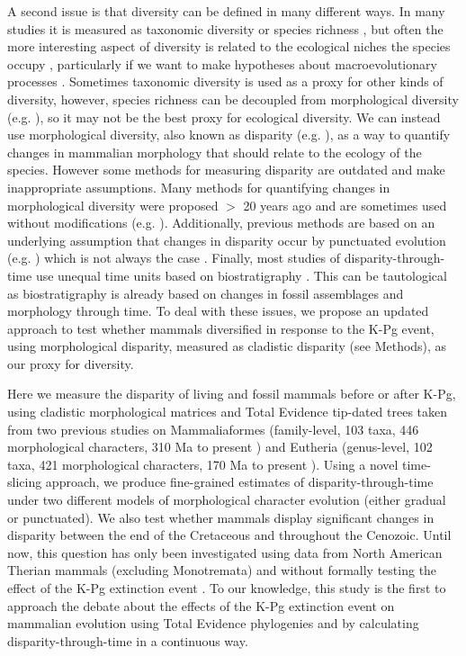 \documentclass[12pt,letterpaper]{article}
\begin{document}
A second issue is that diversity can be defined in many different ways.
In many studies it is measured as taxonomic diversity or species richness \cite{Stadler12042011,meredithimpacts2011,OLeary08022013}, but often the more interesting aspect of diversity is related to the ecological niches the species occupy \cite{Brusatte12092008,toljagictriassic-jurassic2013}, particularly if we want to make hypotheses about macroevolutionary processes \cite{Losos2010,glor2010phylogenetic,benton2015}.
Sometimes taxonomic diversity is used as a proxy for other kinds of diversity, however, species richness can be decoupled from morphological diversity (e.g. \cite{slaterCetacean,ruta2013,hopkinsdecoupling2013}), so it may not be the best proxy for ecological diversity.
We can instead use morphological diversity, also known as disparity (e.g. \cite{Wills1994}), as a way to quantify changes in mammalian morphology that should relate to the ecology of the species.
However some methods for measuring disparity are outdated and make inappropriate assumptions.
Many methods for quantifying changes in morphological diversity were proposed $>$ 20 years ago \cite{Foote01071994,Wills1994} and are sometimes used without modifications (e.g. \cite{Brusatte12092008,thorneresetting2011,toljagictriassic-jurassic2013,ruta2013,bensonfaunal2014}).
Additionally, previous methods are based on an underlying assumption that changes in disparity occur by punctuated evolution (e.g. \cite{Brusatte12092008}) which is not always the case \cite{Hunt21042015}.
Finally, most studies of disparity-through-time use unequal time units based on biostratigraphy \cite{Brusatte12092008,toljagictriassic-jurassic2013}. 
This can be tautological as biostratigraphy is already based on changes in fossil assemblages and morphology through time.
To deal with these issues, we propose an updated approach to test whether mammals diversified in response to the K-Pg event, using morphological disparity, measured as cladistic disparity (see Methods), as our proxy for diversity.

Here we measure the disparity of living and fossil mammals before or after K-Pg, using cladistic morphological matrices and Total Evidence tip-dated trees taken from two previous studies on Mammaliaformes (family-level, 103 taxa, 446 morphological characters, 310 Ma to present \cite{Slater2012MEE}) and Eutheria (genus-level, 102 taxa, 421 morphological characters, 170 Ma to present \cite{beckancient2014}). 
Using a novel time-slicing approach, we produce fine-grained estimates of disparity-through-time under two different models of morphological character evolution (either gradual or punctuated). 
We also test whether mammals display significant changes in disparity between the end of the Cretaceous and throughout the Cenozoic.
Until now, this question has only been investigated using data from North American Therian mammals (excluding Monotremata) and without formally testing the effect of the K-Pg extinction event \cite{Wilson2013}.
To our knowledge, this study is the first to approach the debate about the effects of the K-Pg extinction event on mammalian evolution using Total Evidence phylogenies and by calculating disparity-through-time in a continuous way.
\end{document}
